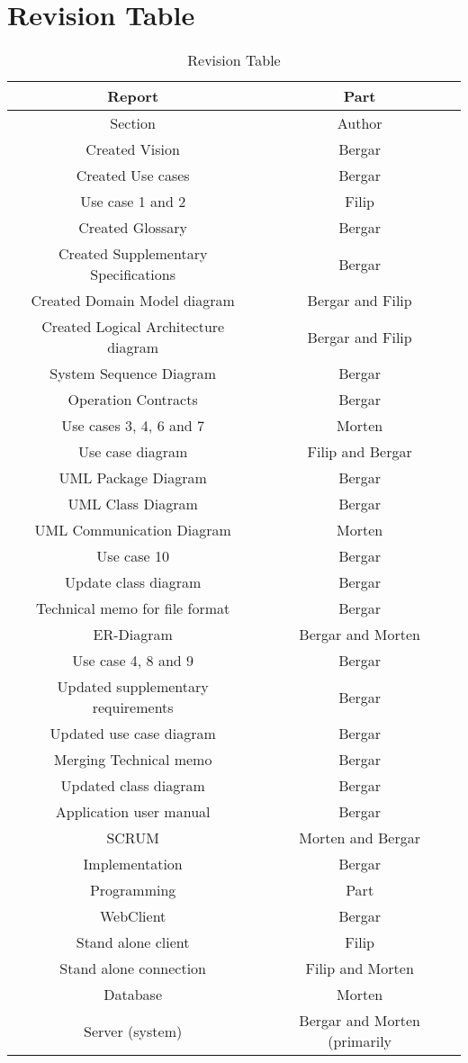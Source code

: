 \documentclass[11pt,a4paper]{article}
\begin{document}
\section{Revision Table}


\begin{table}[h]
\caption{Revision Table}
\begin{center}
\begin{tabular}{c|c}
\hline 
Report & Part \\ \hline
Section & Author \\ \hline 
Created Vision & Bergar \\ 
Created Use cases & Bergar \\
Use case 1 and 2 & Filip \\
Created Glossary & Bergar\\
Created Supplementary Specifications & Bergar \\ 
Created Domain Model diagram & Bergar and Filip \\
Created Logical Architecture diagram & Bergar and Filip \\
\hline 
System Sequence Diagram & Bergar \\
Operation Contracts & Bergar \\
Use cases 3, 4, 6 and 7 & Morten \\
Use case diagram & Filip and Bergar \\
\hline
UML Package Diagram & Bergar \\
UML Class Diagram & Bergar \\
\hline
UML Communication Diagram & Morten \\
\hline
Use case 10 & Bergar \\
Update class diagram & Bergar \\
Technical memo for file format & Bergar \\
ER-Diagram & Bergar and Morten  \\
\hline
Use case 4, 8 and 9 & Bergar \\
Updated supplementary requirements & Bergar \\
Updated use case diagram & Bergar \\
Merging Technical memo & Bergar \\
Updated class diagram & Bergar \\
Application user manual & Bergar \\
SCRUM & Morten and Bergar \\
Implementation & Bergar \\ \hline
Programming & Part \\ \hline
WebClient & Bergar \\
Stand alone client & Filip \\
Stand alone connection & Filip and Morten \\
Database & Morten \\
Server (system) & Bergar and Morten (primarily \\


\end{tabular} 
\end{center}
\end{table}
\end{document}
